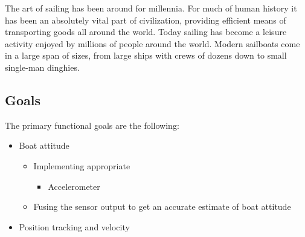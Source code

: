 

The art of sailing has been around for millennia. For much of human history it has been an absolutely vital part of civilization, providing efficient means of transporting goods all around the world. Today sailing has become a leisure activity enjoyed by millions of people around the world. Modern sailboats come in a large span of sizes, from large ships with crews of dozens down to small single-man dinghies.

\subsection{Goals}
The primary functional goals are the following:
\begin{itemize}[noitemsep] %
	\item Boat attitude
	\begin{itemize}[noitemsep]
		\item Implementing appropriate
		\begin{itemize}[noitemsep]
			\item Accelerometer
		\end{itemize}
		\item Fusing the sensor output to get an accurate estimate of boat attitude
	\end{itemize}
	\item Position tracking and velocity
\end{itemize}

\thispagestyle{empty}